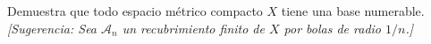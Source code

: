 
\item Demuestra que todo espacio métrico compacto $X$ tiene una base numerable. \textit{[Sugerencia: Sea $\mathcal{A}_n$ un recubrimiento finito de $X$ por bolas de radio $1/n$.]}

